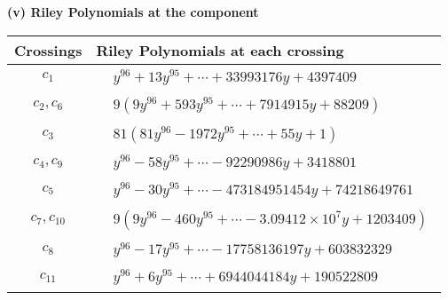 \documentclass[1p]{elsarticle_modified}
\theoremstyle{definition}
\begin{document}
\newpage\renewcommand{\arraystretch}{1}
\flushleft \textbf{(v) Riley Polynomials at the component}\newline \\
\begin{tabular}{m{50pt}|m{274pt}}
Crossings & \hspace{64pt}Riley Polynomials at each crossing \\
\hline $$\begin{aligned}c_{1}\end{aligned}$$&$\begin{aligned}
&y^{96}+13 y^{95}+\cdots+33993176 y+4397409
\end{aligned}$\\
\hline $$\begin{aligned}c_{2},c_{6}\end{aligned}$$&$\begin{aligned}
&9(9 y^{96}+593 y^{95}+\cdots+7914915 y+88209)
\end{aligned}$\\
\hline $$\begin{aligned}c_{3}\end{aligned}$$&$\begin{aligned}
&81(81 y^{96}-1972 y^{95}+\cdots+55 y+1)
\end{aligned}$\\
\hline $$\begin{aligned}c_{4},c_{9}\end{aligned}$$&$\begin{aligned}
&y^{96}-58 y^{95}+\cdots-92290986 y+3418801
\end{aligned}$\\
\hline $$\begin{aligned}c_{5}\end{aligned}$$&$\begin{aligned}
&y^{96}-30 y^{95}+\cdots-473184951454 y+74218649761
\end{aligned}$\\
\hline $$\begin{aligned}c_{7},c_{10}\end{aligned}$$&$\begin{aligned}
&9(9 y^{96}-460 y^{95}+\cdots-3.09412\times10^{7} y+1203409)
\end{aligned}$\\
\hline $$\begin{aligned}c_{8}\end{aligned}$$&$\begin{aligned}
&y^{96}-17 y^{95}+\cdots-17758136197 y+603832329
\end{aligned}$\\
\hline $$\begin{aligned}c_{11}\end{aligned}$$&$\begin{aligned}
&y^{96}+6 y^{95}+\cdots+6944044184 y+190522809
\end{aligned}$\\
\hline
\end{tabular}\\~\\
\end{document}
